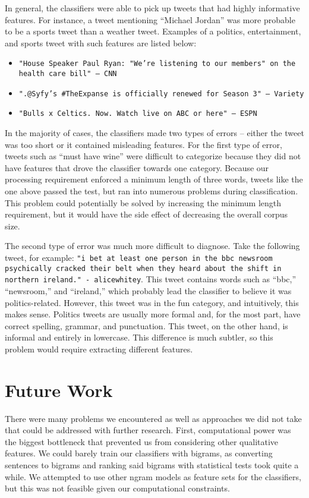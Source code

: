 \documentclass[twocolumn]{article}
\begin{document}
In general, the classifiers were able to pick up tweets that had highly informative features. For instance, a tweet mentioning ``Michael Jordan'' was more probable to be a sports tweet than a weather tweet. Examples of a politics, entertainment, and sports tweet with such features are listed below:
\begin{itemize}
    \itemsep 0em
    \item \texttt{"House Speaker Paul Ryan: "We're listening to our members" on the health care bill" -- CNN}
    \item \texttt{".@Syfy's \#TheExpanse is officially renewed for Season 3" -- Variety}
    \item \texttt{"Bulls x Celtics. Now. Watch live on ABC or here" -- ESPN}
\end{itemize}
In the majority of cases, the classifiers made two types of errors -- either the tweet was too short or it contained misleading features. For the first type of error, tweets such as ``must have wine'' were difficult to categorize because they did not have features that drove the classifier towards one category. Because our processing requirement enforced a minimum length of three words, tweets like the one above passed the test, but ran into numerous problems during classification. This problem could potentially be solved by increasing the minimum length requirement, but it would have the side effect of decreasing the overall corpus size.

The second type of error was much more difficult to diagnose. Take the following tweet, for example: \texttt{"i bet at least one person in the bbc newsroom psychically cracked their belt when they heard about the shift in northern ireland." - alicewhitey}. This tweet contains words such as ``bbc,'' ``newsroom,'' and ``ireland,'' which probably lead the classifier to believe it was politics-related. However, this tweet was in the fun category, and intuitively, this makes sense. Politics tweets are usually more formal and, for the most part, have correct spelling, grammar, and punctuation. This tweet, on the other hand, is informal and entirely in lowercase. This difference is much subtler, so this problem would require extracting different features.

\section{Future Work}

There were many problems we encountered as well as approaches we did not take that could be addressed with further research. First, computational power was the biggest bottleneck that prevented us from considering other qualitative features. We could barely train our classifiers with bigrams, as converting sentences to bigrams and ranking said bigrams with statistical tests took quite a while. We attempted to use other ngram models as feature sets for the classifiers, but this was not feasible given our computational constraints.
\end{document}
